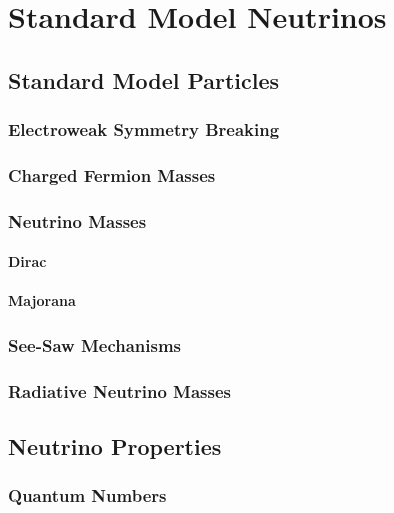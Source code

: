 \setchapterpreamble[u]{\margintoc}

\chapter{Standard Model Neutrinos}


\section{Standard Model Particles}

\subsection{Electroweak Symmetry Breaking}

\subsection{Charged Fermion Masses}

\subsection{Neutrino Masses}

\subsubsection{Dirac}

\subsubsection{Majorana}


\subsection{See-Saw Mechanisms}

\subsection{Radiative Neutrino Masses}


\section{Neutrino Properties}

\subsection{Quantum Numbers}

